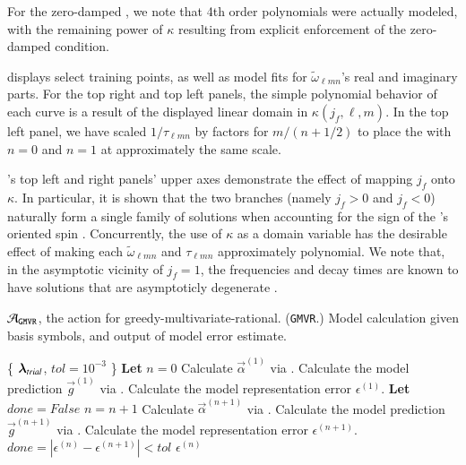 \documentclass[twocolumn,aps,prd,floatfix,preprintnumbers,a4paper,nofootinbib,
superscriptaddress,10pt]{revtex4-1}
\newcommand{\cw}{\tilde{\omega}}
\def\jf{j_f}
\def\lmn{_{\ell m n}}
\def\gmvr#1{greedy-multivariate-rational#1
  (\texttt{GMVR}#1)\gdef\gmvr{\texttt{GMVR}}}
\begin{document}
%
For the zero-damped , we note that 4th order polynomials were actually modeled, with the remaining power of $\kappa$ resulting from explicit enforcement of the zero-damped condition.
%
\par {} displays select training points, as well as model fits for $\cw\lmn$'s real and imaginary parts.
%
For the top right and top left panels, the simple polynomial behavior of each curve is a result of the displayed linear domain in $\kappa(\jf,\ell,m)$.
%
In the top left panel, we have scaled $1/\tau\lmn$ by factors for $m/(n+1/2)$ to place the  with $n=0$ and $n=1$ at approximately the same scale.
%
\begin{widetext}
	
\end{widetext}
%
\par {}'s top left and right panels' upper axes demonstrate the effect of mapping $\jf$ onto $\kappa$.
%
In particular, it is shown that the two branches (namely $\jf>0$ and $\jf<0$) naturally form a single family of solutions when accounting for the sign of the \bh{}'s oriented spin \cite{Husa:2015iqa}.
%
Concurrently, the use of $\kappa$ as a domain variable has the desirable effect of making each $\cw\lmn$ and $\tau\lmn$ approximately polynomial.
%
We note that, in the asymptotic vicinity of $\jf=1$, the \qnm{} frequencies and decay times are known to have solutions that are asymptoticly degenerate \cite{Yang:2012he,Zimmerman:2015trm}.
%
{\scriptsize
\begin{algorithm}[H]
  \caption{$\mathcal{A}_{\gmvr}$, the action for \gmvr. Model calculation given basis symbols, and output of model error estimate.}
  \label{alg:A_gmvr}
  \begin{algorithmic}[1]
     \{ ${\bm{\lambda}}_{trial}$, $tol=10^{-3}$ \}
    \vskip 10pt
    \State \textbf{Let} $n=0$
    \State Calculate $\vec{\alpha}^{(1)}$ via .
    \State Calculate the model prediction $\vec{g}^{(1)}$ via .
    \State Calculate the model representation error $\epsilon^{(1)}$.
    \State \textbf{Let} $done = False$
      \State $n=n+1$
      \State Calculate $\vec{\alpha}^{(n+1)}$  via .
      \State Calculate the model prediction $\vec{g}^{(n+1)}$ via .
      \State Calculate the model representation error $\epsilon^{(n+1)}$.
      \State $done = |\epsilon^{(n)}-\epsilon^{(n+1)}| < tol$
    \EndWhile
    \vskip 10pt
     $\epsilon^{(n)}$
  \end{algorithmic}
\end{algorithm}
}
\end{document}
